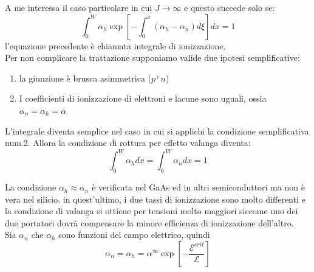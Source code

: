 A me interessa il caso particolare in cui $J \rightarrow \infty$ e questo succede solo se:
\begin{equation*}
    \int_{0}^{W}\alpha_h \exp{\left[ -\int_{0}^{x} (\alpha_h - \alpha_n) d\xi \right] dx} =1
\end{equation*}
%
l'equazione precedente è chiamata integrale di ionizzazione.\\
Per non complicare la trattazione supponiamo valide due ipotesi 
semplificative:
 \begin{enumerate}
     \item la giunzione è brusca asimmetrica ($p^+n$)
     \item I coefficienti di ionizzazione di elettroni e lacune sono uguali, ossia $\alpha_n=\alpha_h=\alpha$
 \end{enumerate}
L'integrale diventa semplice nel caso in cui si applichi la condizione semplificativa num.2.  Allora la condizione di rottura per effetto valanga diventa:
\begin{equation}
    \int_{0}^{W}\alpha_h dx = \int_{0}^{W}\alpha_n dx = 1 
\end{equation}

La condizione $\alpha_h \approx \alpha_n$ è verificata nel GaAs ed in altri semiconduttori ma non è vera nel silicio. in quest'ultimo, i due tassi di ionizzazione sono molto differenti e la condizione di valanga si ottiene per tensioni molto maggiori siccome uno dei due portatori dovrà compensare la minore efficienza di ionizzazione dell'altro.\\
%
Sia $\alpha_n$ che $\alpha_h$ sono funzioni del campo elettrico, quindi 
\begin{equation}
    \alpha_n = \alpha_h=\alpha^{\infty} \exp\left[ -\dfrac{\mathcal{E}^{crit}}{\mathcal{E}} \right]
\end{equation}

